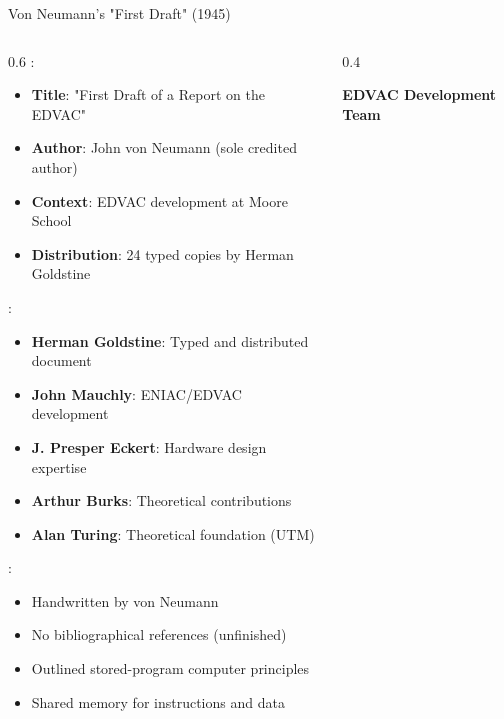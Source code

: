 \begin{frame}{Von Neumann's "First Draft" (1945)}
\begin{columns}
\begin{column}{0.6\textwidth}
:
\begin{itemize}
\item \textbf{Title}: "First Draft of a Report on the EDVAC"
\item \textbf{Author}: John von Neumann (sole credited author)
\item \textbf{Context}: EDVAC development at Moore School
\item \textbf{Distribution}: 24 typed copies by Herman Goldstine
\end{itemize}

\vspace{0.3cm}
:
\begin{itemize}
\item \textbf{Herman Goldstine}: Typed and distributed document
\item \textbf{John Mauchly}: ENIAC/EDVAC development
\item \textbf{J. Presper Eckert}: Hardware design expertise
\item \textbf{Arthur Burks}: Theoretical contributions
\item \textbf{Alan Turing}: Theoretical foundation (UTM)
\end{itemize}

\vspace{0.3cm}
:
\begin{itemize}
\item Handwritten by von Neumann
\item No bibliographical references (unfinished)
\item Outlined stored-program computer principles
\item Shared memory for instructions and data
\end{itemize}
\end{column}
\begin{column}{0.4\textwidth}
\begin{center}
\textbf{EDVAC Development Team}
\vspace{0.3cm}

\end{center}
\end{column}
\end{columns}
\end{frame}
